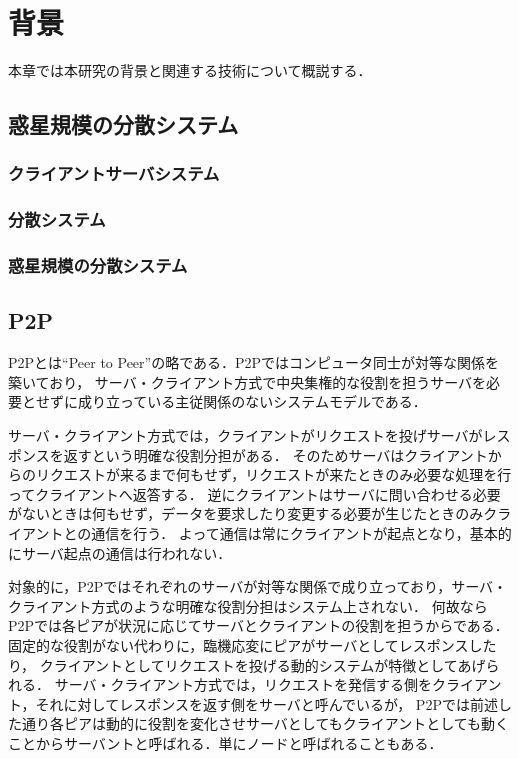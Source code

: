 \chapter{背景}
\label{background}

本章では本研究の背景と関連する技術について概説する．

\section{惑星規模の分散システム}

\subsection{クライアントサーバシステム}

\subsection{分散システム}

\subsection{惑星規模の分散システム}

\section{P2P}

P2Pとは``Peer to Peer''の略である．P2Pではコンピュータ同士が対等な関係を築いており，
サーバ・クライアント方式で中央集権的な役割を担うサーバを必要とせずに成り立っている主従関係のないシステムモデルである．

サーバ・クライアント方式では，クライアントがリクエストを投げサーバがレスポンスを返すという明確な役割分担がある．
そのためサーバはクライアントからのリクエストが来るまで何もせず，リクエストが来たときのみ必要な処理を行ってクライアントへ返答する．
逆にクライアントはサーバに問い合わせる必要がないときは何もせず，データを要求したり変更する必要が生じたときのみクライアントとの通信を行う．
よって通信は常にクライアントが起点となり，基本的にサーバ起点の通信は行われない．

対象的に，P2Pではそれぞれのサーバが対等な関係で成り立っており，サーバ・クライアント方式のような明確な役割分担はシステム上されない．
何故ならP2Pでは各ピアが状況に応じてサーバとクライアントの役割を担うからである．固定的な役割がない代わりに，臨機応変にピアがサーバとしてレスポンスしたり，
クライアントとしてリクエストを投げる動的システムが特徴としてあげられる．
サーバ・クライアント方式では，リクエストを発信する側をクライアント，それに対してレスポンスを返す側をサーバと呼んでいるが，
P2Pでは前述した通り各ピアは動的に役割を変化させサーバとしてもクライアントとしても動くことからサーバントと呼ばれる．単にノードと呼ばれることもある．

